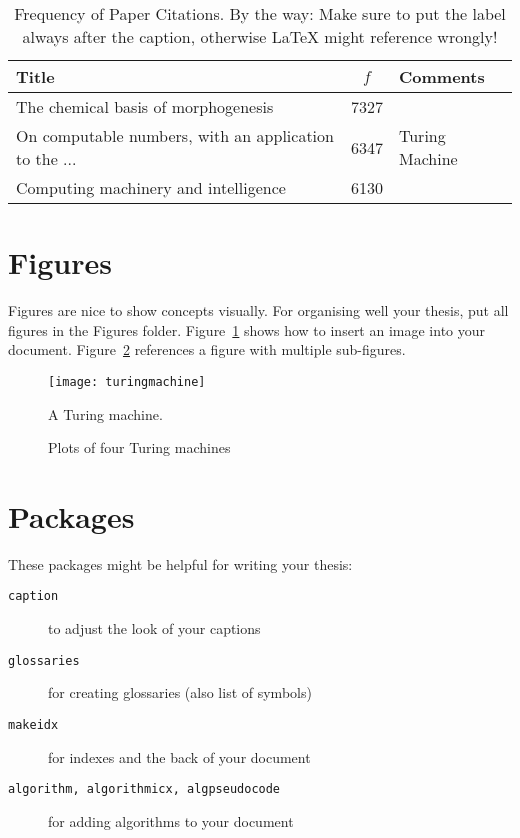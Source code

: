 \begin{table}[ht!]
\centering
\caption{Frequency of Paper Citations. By the way: Make sure to put the label always after the caption, otherwise \LaTeX{} might reference wrongly!}
\begin{tabular}{lcl} \toprule
Title&$f$&Comments\\ \midrule
The chemical basis of morphogenesis & 7327 & \\ 
On computable numbers, with an application to the ... & 6347 & Turing Machine\\
Computing machinery and intelligence & 6130 & \\ \bottomrule
\end{tabular}
\label{tab:table}
\end{table}




\section{Figures}
Figures are nice to show concepts visually. For organising well your thesis, put all figures in the Figures folder. Figure~\ref{fig:machine} shows how to insert an image into your document. Figure~\ref{fig:tm} references a figure with multiple sub-figures. 

\begin{figure}
\centering
\texttt{[image: turingmachine]}
\caption{A Turing machine.}
\label{fig:machine}
\end{figure}


\begin{figure}
\centering
{}
\caption{Plots of four Turing machines}
\label{fig:tm}
\end{figure}




\section{Packages}
These packages might be helpful for writing your thesis:

\begin{description}
	\item[\texttt{caption}] to adjust the look of your captions
	\item[\texttt{glossaries}] for creating glossaries (also list of symbols)
	\item[\texttt{makeidx}] for indexes and the back of your document
	\item[\texttt{algorithm, algorithmicx, algpseudocode}] for adding algorithms to your document
\end{description}